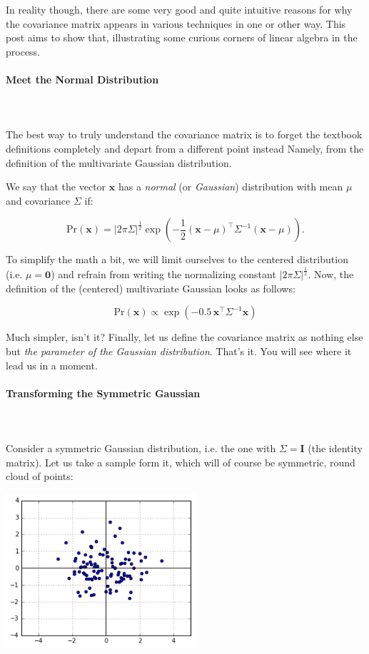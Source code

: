\documentclass{article}
\begin{document}
In reality though, there are some very good and quite intuitive reasons for why the covariance matrix appears in various techniques in one or other way. This post aims to show that, illustrating some curious corners of linear algebra in the process.

\paragraph{Meet the Normal Distribution}\mbox{}\\\\
The best way to truly understand the covariance matrix is to forget the textbook definitions completely and depart from a different point instead Namely, from the definition of the multivariate Gaussian distribution.\medskip

We say that the vector $\bm{x}$ has a \textit{normal} (or \textit{Gaussian}) distribution with mean $\mu$ and covariance $\Sigma$ if:

$$
 \text{Pr}(\bm{x}) = \big|2\pi\Sigma\big|^{\frac{1}{2}} \exp\left(-\frac{1}{2}(\bm{x}-\mu)^{\intercal}\Sigma^{-1}(\bm{x}-\mu)\right).
$$

To simplify the math a bit, we will limit ourselves to the centered distribution (i.e. $\mu = \bm{0}$) and refrain from writing the normalizing constant $\big|2\pi\Sigma\big|^{\frac{1}{2}}$. Now, the definition of the (centered) multivariate Gaussian looks as follows:

$$
  \text{Pr}(\bm{x})\propto\exp\left(-0.5\,\bm{x}^{\intercal}\Sigma^{-1}\bm{x}\right)
$$

Much simpler, isn't it? Finally, let us define the covariance matrix as nothing else but \textit{the parameter of the Gaussian distribution}. That's it. You will see where it lead us in a moment.

\paragraph{Transforming the Symmetric Gaussian}\mbox{}\\\\
Consider a symmetric Gaussian distribution, i.e. the one with $\Sigma = \bm{I}$ (the identity matrix). Let us take a sample form it, which will of course be symmetric, round cloud of points:
 
\begin{center}
  \includegraphics[width=7cm]{figs_hints_1.png}
\end{center}
\end{document}
